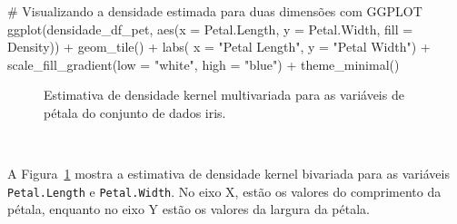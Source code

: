 \documentclass[
  a4paperpaper,
]{article}
\newenvironment{Shaded}{\begin{snugshade}}{\end{snugshade}}
\newcommand{\AttributeTok}[1]{\textcolor[rgb]{0.40,0.45,0.13}{#1}}
\newcommand{\CommentTok}[1]{\textcolor[rgb]{0.37,0.37,0.37}{#1}}
\newcommand{\FunctionTok}[1]{\textcolor[rgb]{0.28,0.35,0.67}{#1}}
\newcommand{\NormalTok}[1]{\textcolor[rgb]{0.00,0.23,0.31}{#1}}
\newcommand{\SpecialCharTok}[1]{\textcolor[rgb]{0.37,0.37,0.37}{#1}}
\newcommand{\StringTok}[1]{\textcolor[rgb]{0.13,0.47,0.30}{#1}}
\begin{document}
\begin{Shaded}
\begin{Highlighting}[]
\CommentTok{\# Visualizando a densidade estimada para duas dimensões com GGPLOT}
\FunctionTok{ggplot}\NormalTok{(densidade\_df\_pet, }\FunctionTok{aes}\NormalTok{(}\AttributeTok{x =}\NormalTok{ Petal.Length, }\AttributeTok{y =}\NormalTok{ Petal.Width, }\AttributeTok{fill =}\NormalTok{ Density)) }\SpecialCharTok{+}
  \FunctionTok{geom\_tile}\NormalTok{() }\SpecialCharTok{+}
  \FunctionTok{labs}\NormalTok{( }\AttributeTok{x =} \StringTok{"Petal Length"}\NormalTok{,}
       \AttributeTok{y =} \StringTok{"Petal Width"}\NormalTok{) }\SpecialCharTok{+}
  \FunctionTok{scale\_fill\_gradient}\NormalTok{(}\AttributeTok{low =} \StringTok{"white"}\NormalTok{, }\AttributeTok{high =} \StringTok{"blue"}\NormalTok{) }\SpecialCharTok{+}
  \FunctionTok{theme\_minimal}\NormalTok{()}
\end{Highlighting}
\end{Shaded}

\begin{figure}[H]


\caption{\label{fig-densidadeiris3}Estimativa de densidade kernel
multivariada para as variáveis de pétala do conjunto de dados iris.}

\end{figure}%

~

A Figura~\ref{fig-densidadeiris3} mostra a estimativa de densidade
kernel bivariada para as variáveis \texttt{Petal.Length} e
\texttt{Petal.Width}. No eixo X, estão os valores do comprimento da
pétala, enquanto no eixo Y estão os valores da largura da pétala.
\end{document}
